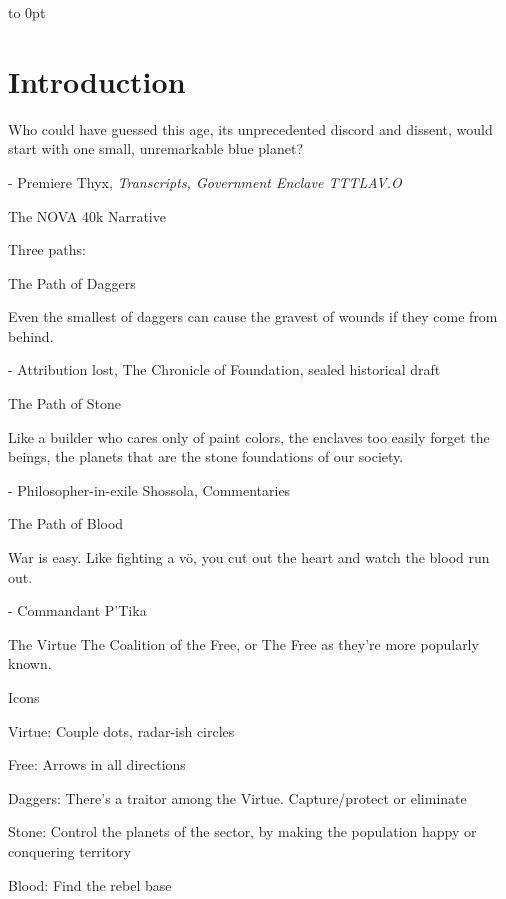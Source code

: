 \documentclass{novanarrative}
\begin{document}
\squelchbackground


\pagebreak
\thispagestyle{empty}
\vbox to 0pt{}
\pagebreak

\restorebackground
\setcounter{page}{1}

\chapter{Introduction}

\backgroundpicodd

Who could have guessed this age, its unprecedented discord and
dissent, would start with one small, unremarkable blue planet?

- Premiere Thyx, \textit{Transcripts, Government Enclave TTTLAV.O}




The NOVA 40k Narrative


Three paths:

The Path of Daggers

Even the smallest of daggers can cause the gravest of wounds if they
come from behind.

- Attribution lost, The Chronicle of Foundation, sealed historical draft


The Path of Stone

Like a builder who cares only of paint colors, the enclaves too easily
forget the beings, the planets that are the stone foundations of our
society.

- Philosopher-in-exile Shossola, Commentaries


The Path of Blood

War is easy.  Like fighting a v\"o, you cut out the heart and watch
the blood run out.

- Commandant P'Tika





The Virtue
The Coalition of the Free, or The Free as they're more popularly known.

Icons

Virtue: Couple dots, radar-ish circles

Free: Arrows in all directions


Daggers: There's a traitor among the Virtue.  Capture/protect or eliminate

Stone: Control the planets of the sector, by making the population happy or
conquering territory

Blood: Find the rebel base
\end{document}
